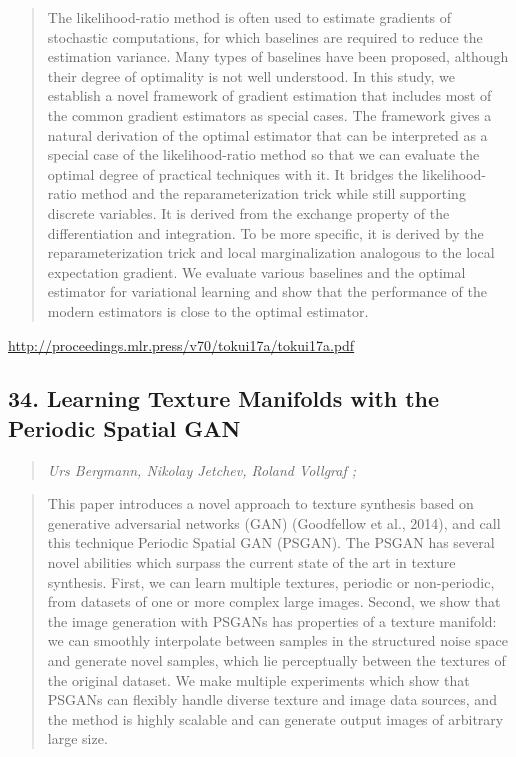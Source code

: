 \documentclass{article}
\begin{document}
\begin{quote}
    The likelihood-ratio method is often used to estimate gradients of stochastic computations, for which baselines are required to reduce the estimation variance. Many types of baselines have been proposed, although their degree of optimality is not well understood. In this study, we establish a novel framework of gradient estimation that includes most of the common gradient estimators as special cases. The framework gives a natural derivation of the optimal estimator that can be interpreted as a special case of the likelihood-ratio method so that we can evaluate the optimal degree of practical techniques with it. It bridges the likelihood-ratio method and the reparameterization trick while still supporting discrete variables. It is derived from the exchange property of the differentiation and integration. To be more specific, it is derived by the reparameterization trick and local marginalization analogous to the local expectation gradient. We evaluate various baselines and the optimal estimator for variational learning and show that the performance of the modern estimators is close to the optimal estimator.  
\end{quote}

\href{http://proceedings.mlr.press/v70/tokui17a/tokui17a.pdf}{http://proceedings.mlr.press/v70/tokui17a/tokui17a.pdf}

\subsection{34. Learning Texture Manifolds with the Periodic Spatial GAN}

\begin{quote}
\footnotesize{\textit{Urs Bergmann, Nikolay Jetchev, Roland Vollgraf ;}}

\end{quote}

\begin{quote}
    This paper introduces a novel approach to texture synthesis based on generative adversarial networks (GAN) (Goodfellow et al., 2014), and call this technique Periodic Spatial GAN (PSGAN). The PSGAN has several novel abilities which surpass the current state of the art in texture synthesis. First, we can learn multiple textures, periodic or non-periodic, from datasets of one or more complex large images. Second, we show that the image generation with PSGANs has properties of a texture manifold: we can smoothly interpolate between samples in the structured noise space and generate novel samples, which lie perceptually between the textures of the original dataset. We make multiple experiments which show that PSGANs can flexibly handle diverse texture and image data sources, and the method is highly scalable and can generate output images of arbitrary large size.  
\end{quote}
\end{document}
